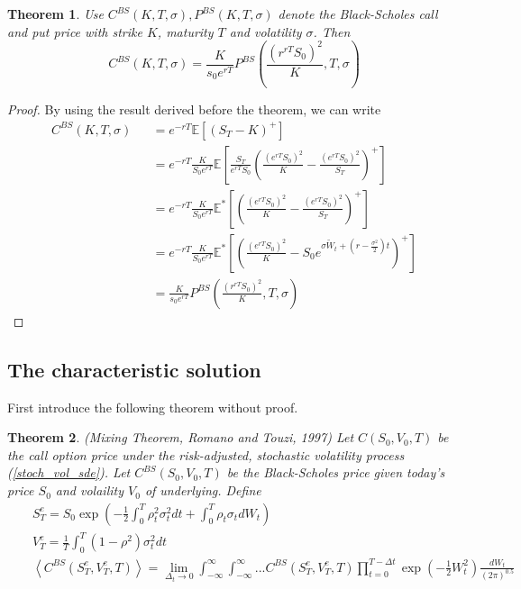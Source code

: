 \documentclass[10pt]{article}
\theoremstyle{plain}
\newtheorem{theorem}{Theorem}[section]
\numberwithin{equation}{section}
\numberwithin{table}{section}
\newcommand{\s}{\sigma}
\newcommand{\prt}[1]{\left( #1 \right)}  %
\newcommand{\E}{\mathbb{E}}
\begin{document}
\begin{theorem}
    Use $C^{BS}(K,T,\s), P^{BS}(K,T,\s)$ denote the Black-Scholes call and put price with strike $K$, maturity $T$ and volatility $\s$. Then 
    \[
        C^{BS}(K,T,\s) = \frac{K}{s_0e^{rT}}P^{BS}\prt{\frac{(r^{rT}S_0)^2}{K},T,\s}    
    \]
\end{theorem}
\begin{proof}

    By using the result derived before the theorem, we can write 
    \begin{eqnarray*}
        C^{BS}(K, T, \s) &&= e^{-rT} \E[(S_T-K)^+] \\
        &&= e^{-rT} \frac{K}{S_0 e^{rT}} \E \left[ \frac{S_T}{e^{rT}S_0} \prt{\frac{(e^{rT} S_0)^2}{K} - \frac{(e^{rT} S_0)^2}{S_T} }^+ \right] \\
        &&= e^{-rT} \frac{K}{S_0 e^{rT}} \E^* \left[\prt{\frac{(e^{rT} S_0)^2}{K} - \frac{(e^{rT} S_0)^2}{S_T} }^+  \right] \\
        &&= e^{-rT} \frac{K}{S_0 e^{rT}} \E^* \left[\prt{\frac{(e^{rT} S_0)^2}{K} - S_0  e^{\s \tilde{W}_t +(r-\frac{\s^2}{2})t} }^+  \right] \\
        &&=\frac{K}{s_0e^{rT}}P^{BS}\prt{\frac{(r^{rT}S_0)^2}{K},T,\s}  
    \end{eqnarray*}
\end{proof}


\subsection{The characteristic solution}
First introduce the following theorem without proof.

\begin{theorem}(Mixing Theorem, Romano and Touzi, 1997)
    Let $C(S_0,V_0,T) $ be the call option price under
    the risk-adjusted, stochastic volatility process (\ref{stoch_vol_sde}). Let $C^{BS}(S_0, V_0, T)$ be the Black-Scholes price given today's price $S_0$ and volaility $V_0$ of underlying. Define 
    \begin{eqnarray*}
        && S^e_T=S_0\exp \prt{-\frac{1}{2}\int^T_0 \rho_t^2 \s_t^2 dt + \int^T_0 \rho_t  \s_t d W_t } \\
        && V^e_T=\frac{1}{T} \int_0^T (1-\rho^2) \s_t^2 dt \\
        && \left< C^{BS}(S_T^e, V_T^e, T) \right> = \lim_{\Delta_t \rightarrow 0} \int^{\infty}_{-\infty} \int^{\infty}_{-\infty}...C^{BS}(S_T^e, V_T^e, T) \prod_{t=0}^{T-\Delta t} \exp(-\frac{1}{2} W^2_t )
        \frac{dW_t}{(2\pi)^{0.5}}
    \end{eqnarray*}
\end{theorem}
\end{document}
